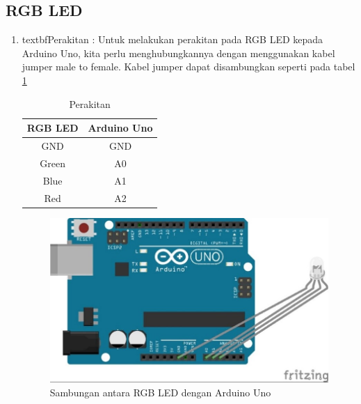 \subsection{RGB LED}
\begin{enumerate}
\item textbf{Perakitan} : Untuk melakukan perakitan pada RGB LED kepada Arduino Uno, kita perlu menghubungkannya dengan menggunakan kabel jumper male to female. Kabel jumper dapat disambungkan seperti pada tabel \ref{table:Perakitan RGB LED}
\begin{table}[h]
\caption{Perakitan}
\centering
\begin{tabular}{|c|c|}
\hline
\textbf{RGB LED}&\textbf{Arduino Uno}\\
\hline
GND&GND\\
\hline
Green&A0\\
\hline
Blue&A1\\
\hline
Red&A2\\
\hline
\end{tabular}
\label{table:Perakitan RGB LED}
\end{table}

\begin{figure}[!htbp]
\centering
\includegraphics[width=.75\textwidth]{figures/CONV/rgb.jpg}
\caption{Sambungan antara RGB LED dengan Arduino Uno}\label{fig:rgb}
\end{figure}


\end{enumerate}
